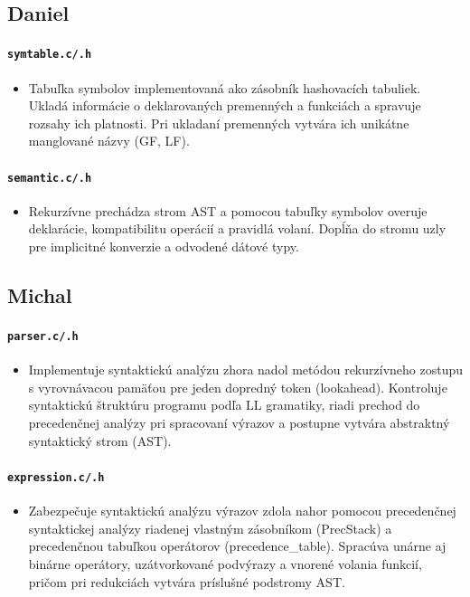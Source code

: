 \subsection{Daniel}

\paragraph{\texttt{symtable.c/.h}}
\begin{itemize}
    \item Tabuľka symbolov implementovaná ako zásobník hashovacích tabuliek. Ukladá informácie o deklarovaných premenných a funkciách a spravuje rozsahy ich platnosti. Pri ukladaní premenných vytvára ich unikátne manglované názvy (GF, LF).
\end{itemize}

\paragraph{\texttt{semantic.c/.h}}
\begin{itemize}
    \item Rekurzívne prechádza strom AST a pomocou tabuľky symbolov overuje deklarácie, kompatibilitu operácií a pravidlá volaní. Dopĺňa do stromu uzly pre implicitné konverzie a odvodené dátové typy.
\end{itemize}


\subsection{Michal}

\paragraph{\texttt{parser.c/.h}}
\begin{itemize}
    \item Implementuje syntaktickú analýzu zhora nadol metódou rekurzívneho zostupu s vyrovnávacou pamäťou pre jeden dopredný token (lookahead). Kontroluje syntaktickú štruktúru programu podľa LL gramatiky, riadi prechod do precedenčnej analýzy pri spracovaní výrazov a postupne vytvára abstraktný syntaktický strom (AST).
\end{itemize}

\paragraph{\texttt{expression.c/.h}}
\begin{itemize}
    \item Zabezpečuje syntaktickú analýzu výrazov zdola nahor pomocou precedenčnej syntaktickej analýzy riadenej vlastným zásobníkom (PrecStack) a precedenčnou tabuľkou operátorov (precedence\_table). Spracúva unárne aj binárne operátory, uzátvorkované podvýrazy a vnorené volania funkcií, pričom pri redukciách vytvára príslušné podstromy AST.
\end{itemize}

